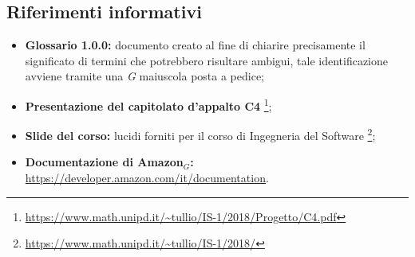 \subsection{Riferimenti informativi}
\begin{itemize}
	
	\item \textbf{Glossario 1.0.0:} documento creato al fine di chiarire precisamente il significato di termini che potrebbero risultare ambigui, tale identificazione avviene tramite una \textit{G} maiuscola posta a pedice; 
	\item \textbf{Presentazione del capitolato d'appalto C4} \footnote{\url{https://www.math.unipd.it/~tullio/IS-1/2018/Progetto/C4.pdf}};
	\item \textbf{Slide del corso:} lucidi forniti per il corso di Ingegneria del Software \footnote{\url{https://www.math.unipd.it/~tullio/IS-1/2018/}};
	\item \textbf{Documentazione di Amazon$_{G}$:} \url{https://developer.amazon.com/it/documentation}.
\end{itemize}
